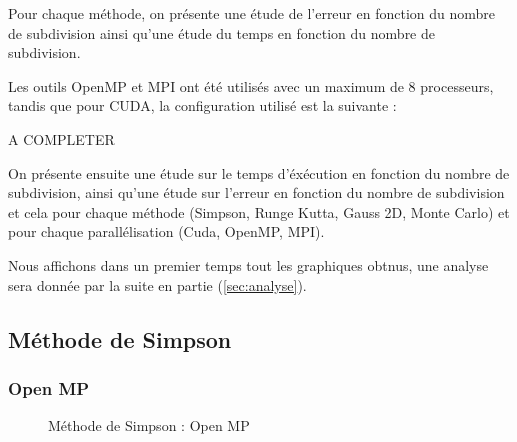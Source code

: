 \documentclass[10pt,a4paper]{article}
\begin{document}
Pour chaque méthode, on présente une étude de l'erreur en fonction du nombre de subdivision ainsi qu'une étude du temps en fonction du nombre de subdivision.

Les outils OpenMP et MPI ont été utilisés avec un maximum de 8 processeurs, tandis que pour CUDA, la configuration utilisé est la suivante : 

A COMPLETER

On présente ensuite une étude sur le temps d'éxécution en fonction du nombre de subdivision, ainsi qu'une étude sur l'erreur en fonction du nombre de subdivision et cela pour chaque méthode (Simpson, Runge Kutta, Gauss 2D, Monte Carlo) et pour chaque parallélisation (Cuda, OpenMP, MPI).

Nous affichons dans un premier temps tout les graphiques obtnus, une analyse sera donnée par la suite en partie (\ref{sec:analyse}).

\subsection{Méthode de Simpson}

\subsubsection{Open MP}


  \begin{figure}[ht!]
    \centering

    \hfill 
  
    \caption{Méthode de Simpson : Open MP}
    \label{fig:simpMP}
  \end{figure}
\end{document}
